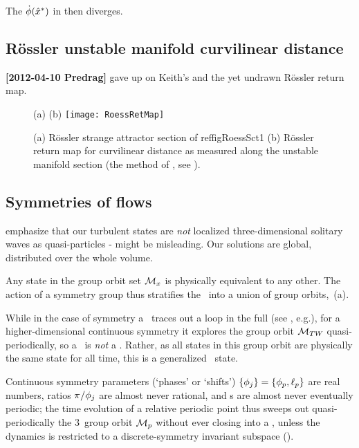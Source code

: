 The {\phaseVel}
$\dot{{\bf \phi}}(\hat{x}^\ast)$ in  then diverges.

\subsection{R\"ossler unstable manifold curvilinear distance}

{\bf [2012-04-10 Predrag]} gave up on Keith's 
and the yet undrawn {R\"ossler return map}.

\begin{figure}
\begin{center}
(a) %
(b) \texttt{[image: RoessRetMap]}
\end{center}
  \caption{
(a) R\"ossler strange attractor section of  reffig{RoessSct1}
(b) R\"ossler return map for curvilinear distance as measured
along the unstable manifold section (the method of
, see ).
  }
\label{fig:RoessRetMap}
\end{figure}



\subsection{Symmetries of flows}
\label{s:symmFL}

													\toCB
emphasize that our turbulent states are \emph{not} localized
three-dimensional solitary waves as quasi-particles -
 might be misleading. Our solutions are global,
distributed over the whole volume.

Any state in the  group orbit set ${\cal M}_{x}$ is physically equivalent
to any other. The action of a symmetry group thus stratifies the
\statesp\ into a union of group orbits, \,{(a)}.

While in the case of  symmetry a \reqv\ traces out a loop in the
full \statesp (see , e.g.), for a
higher-dimensional continuous symmetry it explores the group orbit
${\cal M}_{TW_{}}$ quasi-periodically, so a \reqv\ is \emph{not} a \po.
Rather, as all states in this group orbit are physically the same state
for all time, this is a generalized \eqv\ state.

Continuous symmetry parameters (`phases' or `shifts')
$\{{\bf \phi}_j\}=\{\phi_p,\ell_p\}$ are real numbers, ratios
$\pi/{\bf \phi}_j$ are almost never rational, and \rpo s are almost never
eventually periodic; the time evolution of a relative periodic point thus
sweeps out quasi-periodically the $3$\dmn\ group orbit ${\cal M}_p$ without
ever closing into a \po, unless the dynamics is restricted to a
discrete-symmetry invariant subspace ().

